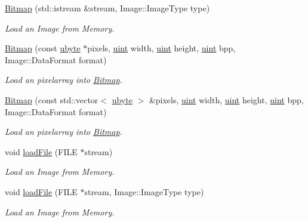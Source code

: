 \begin{DoxyCompactItemize}
\hyperlink{class_f2_c_1_1_bitmap_ad9ff1a578651fe915b28455c39daef4d}{Bitmap} (std::istream \&stream, Image::ImageType type)
\begin{DoxyCompactList}\small\item\em Load an Image from Memory. \item\end{DoxyCompactList}\item 
\hyperlink{class_f2_c_1_1_bitmap_a073dc6afa7a1f97907f60359210b1d6b}{Bitmap} (const \hyperlink{namespace_f2_c_a74fad364688add30796d711e5635ac77}{ubyte} $\ast$pixels, \hyperlink{namespace_f2_c_a58be2bac9eb3e3c99cb41b6008bf4fae}{uint} width, \hyperlink{namespace_f2_c_a58be2bac9eb3e3c99cb41b6008bf4fae}{uint} height, \hyperlink{namespace_f2_c_a58be2bac9eb3e3c99cb41b6008bf4fae}{uint} bpp, Image::DataFormat format)
\begin{DoxyCompactList}\small\item\em Load an pixelarray into \hyperlink{class_f2_c_1_1_bitmap}{Bitmap}. \item\end{DoxyCompactList}\item 
\hyperlink{class_f2_c_1_1_bitmap_a06332b232319d4b47679ac58a37b7c2e}{Bitmap} (const std::vector$<$ \hyperlink{namespace_f2_c_a74fad364688add30796d711e5635ac77}{ubyte} $>$ \&pixels, \hyperlink{namespace_f2_c_a58be2bac9eb3e3c99cb41b6008bf4fae}{uint} width, \hyperlink{namespace_f2_c_a58be2bac9eb3e3c99cb41b6008bf4fae}{uint} height, \hyperlink{namespace_f2_c_a58be2bac9eb3e3c99cb41b6008bf4fae}{uint} bpp, Image::DataFormat format)
\begin{DoxyCompactList}\small\item\em Load an pixelarray into \hyperlink{class_f2_c_1_1_bitmap}{Bitmap}. \item\end{DoxyCompactList}\item 
void \hyperlink{class_f2_c_1_1_bitmap_a79af8ccf66ef1b105ae696978735d465}{loadFile} (FILE $\ast$stream)
\begin{DoxyCompactList}\small\item\em Load an Image from Memory. \item\end{DoxyCompactList}\item 
void \hyperlink{class_f2_c_1_1_bitmap_a0f37fbc47d787ad2dbc9463cab135a44}{loadFile} (FILE $\ast$stream, Image::ImageType type)
\begin{DoxyCompactList}\small\item\em Load an Image from Memory. \item\end{DoxyCompactList}\item 

\end{DoxyCompactItemize}
